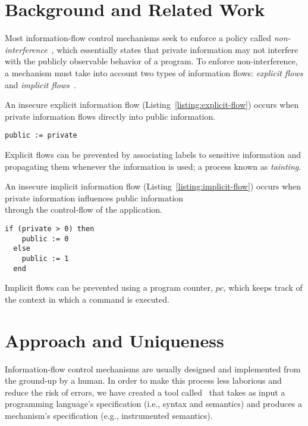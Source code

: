 \documentclass[sigplan,10pt]{acmart}\settopmatter{printfolios=true,printccs=false,printacmref=false}
\begin{document}

\section{Background and Related Work}\label{section:background}
Most information-flow control mechanisms seek to enforce a policy called \emph{non-interference}~\cite{DBLP:conf/sp/GoguenM82a}, which essentially states that private information may not interfere with the publicly observable behavior of a program. To enforce non-interference, a mechanism must take into account two types of information flows: \emph{explicit flows} and \emph{implicit flows}~\cite{DBLP:journals/cacm/Denning76}. 

An insecure explicit information flow (Listing~\ref{listing:explicit-flow}) occurs when private information flows directly into public information. 
\begin{lstlisting}[captionpos=b, caption=Insecure explicit flow, label=listing:explicit-flow]
  public := private
\end{lstlisting}
Explicit flows can be prevented by associating labels to sensitive information and propagating them whenever the information is used; a process known as \emph{tainting}.

An insecure implicit information flow (Listing~\ref{listing:implicit-flow}) occurs when private information influences public information\\through the control-flow of the application.
\pagebreak
\begin{lstlisting}[captionpos=b, caption=Insecure implicit flow, label=listing:implicit-flow]
  if (private > 0) then
    public := 0
  else
    public := 1
  end
\end{lstlisting}
Implicit flows can be prevented using a program counter, $pc$, which keeps track of the context in which a command is executed.

\section{Approach and Uniqueness}
Information-flow control mechanisms are usually designed and implemented from the ground-up by a human. In order to make this process less laborious and reduce the risk of errors, we have created a tool called \ottifc\ that takes as input a programming language's specification (i.e., syntax and semantics) and produces a mechanism's specification (e.g., instrumented semantics). 
\end{document}
